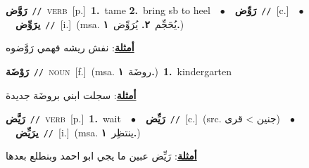 \documentclass[10pt,a4paper,twoside]{article} %
\begin{document}
\begin{multicols}{2}
{\setlength\topsep{0pt}\textbf{\foreignlanguage{arabic}{رَوَّض}}\ {\color{gray}\texttt{//}\color{black}}\ \textsc{verb}\ [p.]\ \textbf{1.}~tame  \textbf{2.}~bring sb to heel\ \ $\bullet$\ \ \setlength\topsep{0pt}\textbf{\foreignlanguage{arabic}{رَوِّض}}\ {\color{gray}\texttt{//}\color{black}}\ [c.]\ \ $\bullet$\ \ \setlength\topsep{0pt}\textbf{\foreignlanguage{arabic}{يرَوِّض}}\ {\color{gray}\texttt{//}\color{black}}\ [i.]\ \color{gray}(msa. \foreignlanguage{arabic}{يُحَجِّم}~\foreignlanguage{arabic}{\textbf{٢.}}  \foreignlanguage{arabic}{يُرَوِّض}~\foreignlanguage{arabic}{\textbf{١.}})\color{black}\  \begin{flushright}\color{gray}\foreignlanguage{arabic}{\textbf{\underline{\foreignlanguage{arabic}{أمثلة}}}: نفش ريشه فهمي رَوَّضوه}\end{flushright}\color{black}} \vspace{2mm}

{\setlength\topsep{0pt}\textbf{\foreignlanguage{arabic}{رَوْضَة}}\ {\color{gray}\texttt{//}\color{black}}\ \textsc{noun}\ [f.]\ \color{gray}(msa. \foreignlanguage{arabic}{روضَة}~\foreignlanguage{arabic}{\textbf{١.}})\color{black}\ \textbf{1.}~kindergarten\  \begin{flushright}\color{gray}\foreignlanguage{arabic}{\textbf{\underline{\foreignlanguage{arabic}{أمثلة}}}: سجلت ابني بروضَة جديدة}\end{flushright}\color{black}} \vspace{2mm}

{\setlength\topsep{0pt}\textbf{\foreignlanguage{arabic}{رَيَّض}}\ {\color{gray}\texttt{//}\color{black}}\ \textsc{verb}\ [p.]\ \textbf{1.}~wait\ \ $\bullet$\ \ \setlength\topsep{0pt}\textbf{\foreignlanguage{arabic}{رَيِّض}}\ {\color{gray}\texttt{//}\color{black}}\ [c.]\ (src. \color{gray}\foreignlanguage{arabic}{جنين > قرى}\color{black})\ \ $\bullet$\ \ \setlength\topsep{0pt}\textbf{\foreignlanguage{arabic}{يرَيِّض}}\ {\color{gray}\texttt{//}\color{black}}\ [i.]\ \color{gray}(msa. \foreignlanguage{arabic}{ينتظِر}~\foreignlanguage{arabic}{\textbf{١.}})\color{black}\  \begin{flushright}\color{gray}\foreignlanguage{arabic}{\textbf{\underline{\foreignlanguage{arabic}{أمثلة}}}: رَيِّض عبين ما يجي ابو احمد وبنطلع بعدها}\end{flushright}\color{black}} \vspace{2mm}


\end{multicols}
\end{document}
